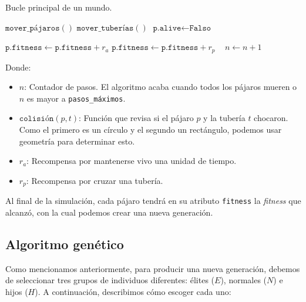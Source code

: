 \documentclass[twocolumn,spanish]{revtex4-1}
\begin{document}
\begin{algorithm}
\caption{Bucle principal de un mundo.}
\label{alg:mundo}
\begin{algorithmic}[]
    \State $\texttt{mover\_pájaros}()$
    \State $\texttt{mover\_tuberías}()$
             
                \State $\texttt{p.alive} \gets \texttt{Falso}$ 
            \EndIf
        \EndFor
    \EndFor
    
     
            \State $\texttt{p.fitness}\gets \texttt{p.fitness} + r_a$ 
                \State $\texttt{p.fitness}\gets \texttt{p.fitness} + r_p$ \
            \EndIf
        \EndIf
    \EndFor
    \State $n\gets n+1$
\EndWhile
\end{algorithmic}
\end{algorithm}
Donde:
\begin{itemize}
    \item $n$: Contador de pasos. El algoritmo acaba cuando todos los pájaros mueren o $n$ es mayor a \texttt{pasos\_máximos}.
    \item $\texttt{colisión}(p,t)$: Función que revisa si el pájaro $p$ y la tubería $t$ chocaron. Como el primero es un círculo y el segundo un rectángulo, podemos usar geometría para determinar esto.
    \item $r_a$: Recompensa por mantenerse vivo una unidad de tiempo.
    \item $r_p$: Recompensa por cruzar una tubería.
\end{itemize}

Al final de la simulación, cada pájaro tendrá en su atributo \texttt{fitness} la \textit{fitness} que alcanzó, con la cual podemos crear una nueva generación.

\subsection{Algoritmo genético}
Como mencionamos anteriormente, para producir una nueva generación, debemos de seleccionar tres grupos de individuos diferentes: élites ($E$), normales ($N$) e hijos ($H$). A continuación, describimos cómo escoger cada uno:
\end{document}
